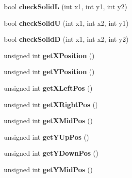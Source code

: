 \begin{DoxyCompactItemize}
\item 
\hypertarget{class_c_object_adb606f665759d229411b317bea7fbea5}{
bool {\bfseries checkSolidL} (int x1, int y1, int y2)}
\label{class_c_object_adb606f665759d229411b317bea7fbea5}

\item 
\hypertarget{class_c_object_af1a25cf3a28e715155288b99bf913b49}{
bool {\bfseries checkSolidU} (int x1, int x2, int y1)}
\label{class_c_object_af1a25cf3a28e715155288b99bf913b49}

\item 
\hypertarget{class_c_object_a0876adaf3d6773ca8c4bc2128c9eea0c}{
bool {\bfseries checkSolidD} (int x1, int x2, int y2)}
\label{class_c_object_a0876adaf3d6773ca8c4bc2128c9eea0c}

\item 
\hypertarget{class_c_object_a3e912da62271e8adb5f5fb02ceeadcad}{
unsigned int {\bfseries getXPosition} ()}
\label{class_c_object_a3e912da62271e8adb5f5fb02ceeadcad}

\item 
\hypertarget{class_c_object_aa3b577b26e2eb1af8dd0d4b34daadcc0}{
unsigned int {\bfseries getYPosition} ()}
\label{class_c_object_aa3b577b26e2eb1af8dd0d4b34daadcc0}

\item 
\hypertarget{class_c_object_a9ea81634a2d857f1b5c67ac20ff11f84}{
unsigned int {\bfseries getXLeftPos} ()}
\label{class_c_object_a9ea81634a2d857f1b5c67ac20ff11f84}

\item 
\hypertarget{class_c_object_aec3bf08b20eb23ff24c32dba204b2c14}{
unsigned int {\bfseries getXRightPos} ()}
\label{class_c_object_aec3bf08b20eb23ff24c32dba204b2c14}

\item 
\hypertarget{class_c_object_a220623a5c6fc95f9b521354626fd103b}{
unsigned int {\bfseries getXMidPos} ()}
\label{class_c_object_a220623a5c6fc95f9b521354626fd103b}

\item 
\hypertarget{class_c_object_a6f87d58e8b79fc1fabae98d37704b9ef}{
unsigned int {\bfseries getYUpPos} ()}
\label{class_c_object_a6f87d58e8b79fc1fabae98d37704b9ef}

\item 
\hypertarget{class_c_object_a85924a8b318cf450228dea2df9b0faea}{
unsigned int {\bfseries getYDownPos} ()}
\label{class_c_object_a85924a8b318cf450228dea2df9b0faea}

\item 
\hypertarget{class_c_object_a5c319955a22f1cc9d2b07df7e5c5b279}{
unsigned int {\bfseries getYMidPos} ()}
\label{class_c_object_a5c319955a22f1cc9d2b07df7e5c5b279}


\end{DoxyCompactItemize}
